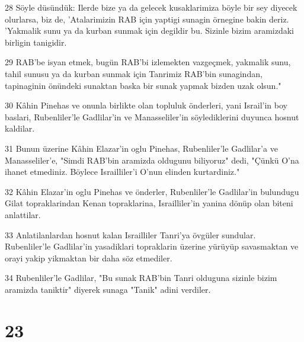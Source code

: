 \par 28 Söyle düsündük: Ilerde bize ya da gelecek kusaklarimiza böyle bir sey diyecek olurlarsa, biz de, 'Atalarimizin RAB için yaptigi sunagin örnegine bakin deriz. 'Yakmalik sunu ya da kurban sunmak için degildir bu. Sizinle bizim aramizdaki birligin tanigidir.
\par 29 RAB'be isyan etmek, bugün RAB'bi izlemekten vazgeçmek, yakmalik sunu, tahil sunusu ya da kurban sunmak için Tanrimiz RAB'bin sunagindan, tapinaginin önündeki sunaktan baska bir sunak yapmak bizden uzak olsun."
\par 30 Kâhin Pinehas ve onunla birlikte olan topluluk önderleri, yani Israil'in boy baslari, Rubenliler'le Gadlilar'in ve Manasseliler'in söylediklerini duyunca hosnut kaldilar.
\par 31 Bunun üzerine Kâhin Elazar'in oglu Pinehas, Rubenliler'le Gadlilar'a ve Manasseliler'e, "Simdi RAB'bin aramizda oldugunu biliyoruz" dedi, "Çünkü O'na ihanet etmediniz. Böylece Israilliler'i O'nun elinden kurtardiniz."
\par 32 Kâhin Elazar'in oglu Pinehas ve önderler, Rubenliler'le Gadlilar'in bulundugu Gilat topraklarindan Kenan topraklarina, Israilliler'in yanina dönüp olan biteni anlattilar.
\par 33 Anlatilanlardan hosnut kalan Israilliler Tanri'ya övgüler sundular. Rubenliler'le Gadlilar'in yasadiklari topraklarin üzerine yürüyüp savasmaktan ve orayi yakip yikmaktan bir daha söz etmediler.
\par 34 Rubenliler'le Gadlilar, "Bu sunak RAB'bin Tanri olduguna sizinle bizim aramizda taniktir" diyerek sunaga "Tanik" adini verdiler.

\chapter{23}

